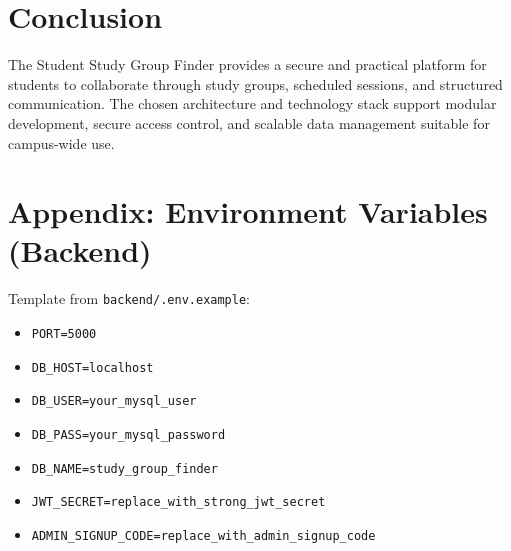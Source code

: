 \documentclass[12pt]{article}
\begin{document}
\section{Conclusion}
The Student Study Group Finder provides a secure and practical platform for students to collaborate through study groups, scheduled sessions, and structured communication. The chosen architecture and technology stack support modular development, secure access control, and scalable data management suitable for campus-wide use.

\appendix
\section{Appendix: Environment Variables (Backend)}
\noindent
Template from \texttt{backend/.env.example}:
\begin{itemize}
  \item \texttt{PORT=5000}
  \item \texttt{DB\_HOST=localhost}
  \item \texttt{DB\_USER=your\_mysql\_user}
  \item \texttt{DB\_PASS=your\_mysql\_password}
  \item \texttt{DB\_NAME=study\_group\_finder}
  \item \texttt{JWT\_SECRET=replace\_with\_strong\_jwt\_secret}
  \item \texttt{ADMIN\_SIGNUP\_CODE=replace\_with\_admin\_signup\_code}
\end{itemize}
\end{document}
